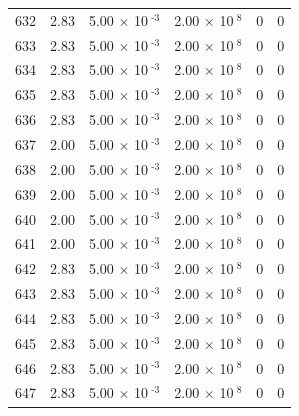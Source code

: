 \documentclass[a4paper,11pt]{article}
\begin{document}
\begin{center}
\begin{longtable}{|R{1.5cm}|R{2.4cm}|R{2.4cm}|R{2.4cm}|R{2.4cm}|R{2.4cm}|}
  632 &   2.83  &         5.00 $\times$ 10$^{\text{          -3}}$  &         2.00 $\times$ 10$^{\text{           8}}$  & 0  & 0 \\
  633 &   2.83  &         5.00 $\times$ 10$^{\text{          -3}}$  &         2.00 $\times$ 10$^{\text{           8}}$  & 0  & 0 \\
  634 &   2.83  &         5.00 $\times$ 10$^{\text{          -3}}$  &         2.00 $\times$ 10$^{\text{           8}}$  & 0  & 0 \\
  635 &   2.83  &         5.00 $\times$ 10$^{\text{          -3}}$  &         2.00 $\times$ 10$^{\text{           8}}$  & 0  & 0 \\
  636 &   2.83  &         5.00 $\times$ 10$^{\text{          -3}}$  &         2.00 $\times$ 10$^{\text{           8}}$  & 0  & 0 \\
  637 &   2.00  &         5.00 $\times$ 10$^{\text{          -3}}$  &         2.00 $\times$ 10$^{\text{           8}}$  & 0  & 0 \\
  638 &   2.00  &         5.00 $\times$ 10$^{\text{          -3}}$  &         2.00 $\times$ 10$^{\text{           8}}$  & 0  & 0 \\
  639 &   2.00  &         5.00 $\times$ 10$^{\text{          -3}}$  &         2.00 $\times$ 10$^{\text{           8}}$  & 0  & 0 \\
  640 &   2.00  &         5.00 $\times$ 10$^{\text{          -3}}$  &         2.00 $\times$ 10$^{\text{           8}}$  & 0  & 0 \\
  641 &   2.00  &         5.00 $\times$ 10$^{\text{          -3}}$  &         2.00 $\times$ 10$^{\text{           8}}$  & 0  & 0 \\
  642 &   2.83  &         5.00 $\times$ 10$^{\text{          -3}}$  &         2.00 $\times$ 10$^{\text{           8}}$  & 0  & 0 \\
  643 &   2.83  &         5.00 $\times$ 10$^{\text{          -3}}$  &         2.00 $\times$ 10$^{\text{           8}}$  & 0  & 0 \\
  644 &   2.83  &         5.00 $\times$ 10$^{\text{          -3}}$  &         2.00 $\times$ 10$^{\text{           8}}$  & 0  & 0 \\
  645 &   2.83  &         5.00 $\times$ 10$^{\text{          -3}}$  &         2.00 $\times$ 10$^{\text{           8}}$  & 0  & 0 \\
  646 &   2.83  &         5.00 $\times$ 10$^{\text{          -3}}$  &         2.00 $\times$ 10$^{\text{           8}}$  & 0  & 0 \\
  647 &   2.83  &         5.00 $\times$ 10$^{\text{          -3}}$  &         2.00 $\times$ 10$^{\text{           8}}$  & 0  & 0 \\

\end{longtable}
\end{center}
\end{document}
